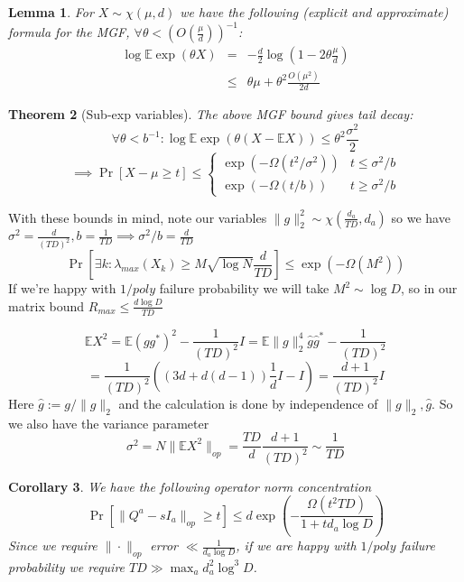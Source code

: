 \documentclass{article}
\newtheorem{theorem}{Theorem}
\newtheorem{corollary}[theorem]{Corollary}
\newtheorem{lemma}[theorem]{Lemma}
\newcommand{\E}{\mathbb{E}}
\begin{document}
\begin{lemma}
For $X \sim \chi(\mu,d)$ we have the following (explicit and approximate) formula for the MGF, $\forall \theta < \left(O(\frac{\mu}{d}) \right)^{-1}$:
\begin{eqnarray*} \log \E \exp(\theta X) & = & - \frac{d}{2} \log \left(1 - 2 \theta \frac{\mu}{d} \right)
\\ & \leq & \theta \mu + \theta^{2} \frac{O(\mu^{2})}{2 d}
\end{eqnarray*}
\end{lemma}

\begin{theorem} [Sub-exp variables]
The above MGF bound gives tail decay:
\[ \forall \theta < b^{-1}: \log \E \exp(\theta (X - \E X)) \leq \theta^{2} \frac{\sigma^{2}}{2} \]
\[ \implies  \Pr[X - \mu \geq t] \leq \begin{cases}
\exp( - \Omega(t^{2}/\sigma^{2}) ) & t \leq \sigma^{2}/b
\\ \exp( - \Omega(t/b) ) & t \geq \sigma^{2}/b
\end{cases}   \]
\end{theorem}

With these bounds in mind, note our variables $\|g\|_{2}^{2} \sim \chi(\frac{d_{a}}{TD},d_{a})$ so we have $\sigma^{2} = \frac{d}{(TD)^{2}}, b = \frac{1}{TD} \implies \sigma^{2}/b = \frac{d}{TD}$
\[ \Pr[ \exists k: \lambda_{max}(X_{k}) \geq M \sqrt{\log N}\frac{d}{TD} ] \leq \exp( - \Omega(M^{2}) )  \]
If we're happy with $1/poly$ failure probability we will take $M^{2} \sim \log D$, so in our matrix bound $R_{max} \leq \frac{d \log D}{TD}$

\[ \E X^{2} = \E (g g^{*})^{2} - \frac{1}{(TD)^{2}} I = \E \|g\|_{2}^{4} \hat{g} \hat{g}^{*} - \frac{1}{(TD)^{2}} \]
\[ = \frac{1}{(TD)^{2}} ( (3d + d(d-1)) \frac{1}{d} I - I ) = \frac{d+1}{(TD)^{2}} I   \]
Here $\hat{g} := g / \|g\|_{2}$ and the calculation is done by independence of $\|g\|_{2}, \hat{g}$. So we also have the variance parameter
\[ \sigma^{2} = N \|\E X^{2}\|_{op} = \frac{TD}{d} \frac{d+1}{(TD)^{2}} \sim \frac{1}{TD}  \]

\begin{corollary}
We have the following operator norm concentration
\[ \Pr[ \|Q^{a} - sI_{a}\|_{op} \geq t ] \leq d \exp \left( - \frac{\Omega(t^{2} TD)}{1 + t d_{a} \log D }  \right)  \]
Since we require $\|\cdot\|_{op}$ error $\ll \frac{1}{d_{a} \log D}$, if we are happy with $1/poly$ failure probability we require $TD \gg \max_{a} d_{a}^{2} \log^{3} D$.
\end{corollary}
\end{document}
